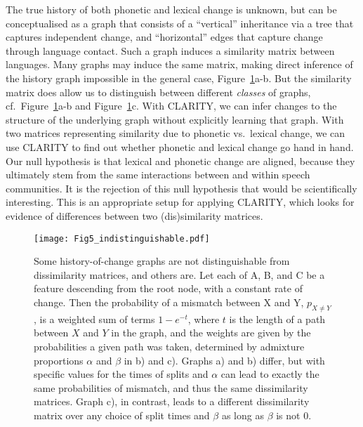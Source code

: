 \documentclass[a4]{article}
\newcommand{\+}[1]{\mathbf{#1}}
\begin{document}
The true history of both phonetic and lexical change is unknown, but can be conceptualised as a graph that consists of a ``vertical'' inheritance via a tree that captures independent change, and ``horizontal'' edges that capture change through language contact. Such a graph induces a similarity matrix between languages. Many graphs may induce the same matrix, making direct inference of the history graph impossible in the general case, Figure~\ref{fig:indistinguishability}a-b. But the similarity matrix does allow us to distinguish between different \emph{classes} of graphs, cf.~Figure~\ref{fig:indistinguishability}a-b and Figure~\ref{fig:indistinguishability}c. With CLARITY, we can infer changes to the structure of the underlying graph without explicitly learning that graph. With two matrices representing similarity due to phonetic vs.~lexical change, we can use CLARITY to find out whether phonetic and lexical change go hand in hand. Our null hypothesis is that lexical and phonetic change are aligned, because they ultimately stem from the same interactions between and within speech communities. It is the rejection of this null hypothesis that would be scientifically interesting. This is an appropriate setup for applying CLARITY, which looks for evidence of differences between two (dis)similarity matrices.

\begin{figure}[!htbp]
\begin{center}
\texttt{[image: Fig5\_indistinguishable.pdf]}

 \caption{Some history-of-change graphs are not distinguishable from dissimilarity matrices, and others are. Let each of A, B, and C be a feature descending from the root node, with a constant rate of change. Then the probability of a mismatch between X and Y, $p_{X\neq Y}$, is a weighted sum of terms $1-e^{-t}$, where $t$ is the length of a path between $X$ and $Y$ in the graph, and the weights are given by the probabilities a given path was taken, determined by admixture proportions $\alpha$ and $\beta$ in b) and c).  Graphs a) and b) differ, but with specific values for the times of splits and $\alpha$ can lead to exactly the same probabilities of mismatch, and thus the same dissimilarity matrices. Graph c), in contrast, leads to a different dissimilarity matrix over any choice of split times and $\beta$ as long as $\beta$ is not 0. 
 \label{fig:indistinguishability}}
\end{center}
\end{figure}
\end{document}
